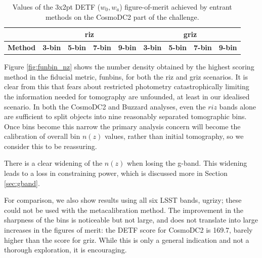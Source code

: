 \documentclass[twocolumn,twocolappendix]{aastex63}
\begin{document}
\begin{table}[]
\begin{tabular}{|l|llll|llll|}
\hline
                & \multicolumn{4}{c|}{\textbf{riz}}      & \multicolumn{4}{c|}{\textbf{griz}}                                \\ \hline
\textbf{Method} & \textbf{3-bin} & \textbf{5-bin} & \textbf{7-bin} & \textbf{9-bin} & \textbf{3-bin} & \textbf{5-bin} & \textbf{7-bin} & \textbf{9-bin} \\ \hline

\hline
\end{tabular}
\caption{Values of the 3x2pt DETF ($w_0,w_a$) figure-of-merit achieved by entrant methods on the 
CosmoDC2 part of the challenge.}
\label{tab:cosmodc2}
\end{table}


Figure \ref{fig:funbin_nz} shows the number density obtained by the highest scoring method in
the fiducial metric, {\sc funbins}, for both the riz and griz scenarios.
It is clear from this that fears about restricted photometry catastrophically limiting
the information needed for tomography are unfounded, at least in our idealised scenario.
In both the CosmoDC2 and Buzzard analyses,
even the $riz$ bands alone are sufficient to split objects into nine reasonably separated
tomographic bins.  Once bins become this narrow the primary analysis concern will become the calibration 
of overall bin $n(z)$ values, rather than initial tomography, so we consider this to be reassuring.

There is a clear widening of the $n(z)$ when losing the g-band.  This widening leads to a loss in 
constraining power, which is discussed more in Section \ref{sec:gband}.

For comparison, we also show results using all six LSST bands, ugrizy; these could not be used
with the metacalibration method. The improvement in the sharpness of the bins is noticeable but not large,
and does not translate into large increases in the figures of merit: the DETF score for CosmoDC2
is 169.7, barely higher than the score for griz.  While this is only a general indication and not
a thorough exploration, it is encouraging.
\end{document}
